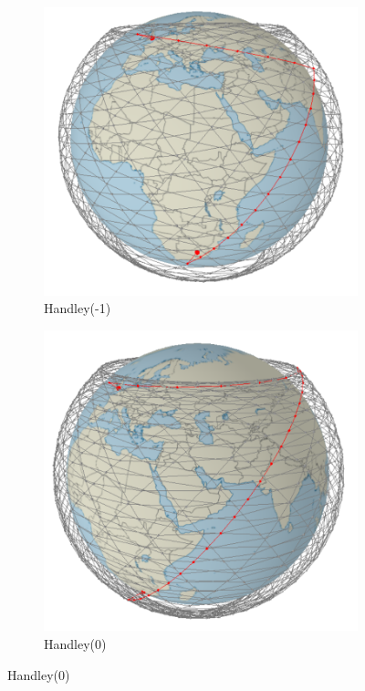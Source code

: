 \documentclass[12pt]{report}
\begin{document}
\begin{figure}
	\centering
	\caption{London - Johannesburg path under different linking methods}
	\label{fig:Screenshots of LDN-JHB}
	\begin{subfigure}[b]{0.4\textwidth}
		\caption{Handley(-1)}
		\includegraphics[width=\textwidth]{LDN-JHB-H-1-1}
	\end{subfigure}
	\hfill
	\begin{subfigure}[b]{0.4\textwidth}
		\caption{Handley(0)}
		\includegraphics[width=\textwidth]{LDN-JHB-H0-1}
	\end{subfigure}
	

\end{figure}
\end{document}
